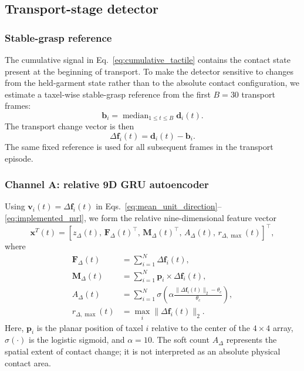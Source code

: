 \subsection{Transport-stage detector}
\label{sec:transport_detector}

\subsubsection{Stable-grasp reference}

The cumulative signal in Eq.~\eqref{eq:cumulative_tactile} contains the
contact state present at the beginning of transport. To make the detector
sensitive to changes from the held-garment state rather than to the absolute
contact configuration, we estimate a taxel-wise stable-grasp reference from
the first $B=30$ transport frames:
%
\begin{equation}
    \mathbf{b}_i
    =
    \operatorname{median}_{1\leq t\leq B}\mathbf{d}_i(t).
    \label{eq:transport_baseline}
\end{equation}
%
The transport change vector is then
%
\begin{equation}
    \Delta\mathbf{f}_i(t)=\mathbf{d}_i(t)-\mathbf{b}_i.
    \label{eq:transport_delta_vector}
\end{equation}
%
The same fixed reference is used for all subsequent frames in the transport
episode.

\subsubsection{Channel A: relative 9D GRU autoencoder}

Using $\mathbf{v}_i(t)=\Delta\mathbf{f}_i(t)$ in
Eqs.~\eqref{eq:mean_unit_direction}--\eqref{eq:implemented_mrl}, we form the
relative nine-dimensional feature vector
%
\begin{equation}
    \mathbf{x}^{T}(t)
    =
    \left[
    z_\Delta(t),\,
    \mathbf{F}_\Delta(t)^\top,\,
    \mathbf{M}_\Delta(t)^\top,\,
    A_\Delta(t),\,
    r_{\Delta,\max}(t)
    \right]^\top ,
    \label{eq:transport_9d}
\end{equation}
%
where
%
\begin{align}
    \mathbf{F}_\Delta(t)
    &=\sum_{i=1}^{N}\Delta\mathbf{f}_i(t),                             
    \label{eq:delta_force}\\
    \mathbf{M}_\Delta(t)
    &=\sum_{i=1}^{N}\mathbf{p}_i\times\Delta\mathbf{f}_i(t),           
    \label{eq:delta_moment}\\
    A_\Delta(t)
    &=\sum_{i=1}^{N}
    \sigma\!\left(
    \alpha\frac{\|\Delta\mathbf{f}_i(t)\|_2-\theta_c}{\theta_c}
    \right),                                                          
    \label{eq:changed_taxel_count}\\
    r_{\Delta,\max}(t)
    &=\max_i\|\Delta\mathbf{f}_i(t)\|_2.                               
    \label{eq:peak_delta_norm}
\end{align}
%
Here, $\mathbf{p}_i$ is the planar position of taxel $i$ relative to the
center of the $4\times4$ array, $\sigma(\cdot)$ is the logistic sigmoid, and
$\alpha=10$. The soft count $A_\Delta$ represents the spatial extent of
contact change; it is not interpreted as an absolute physical contact area.


